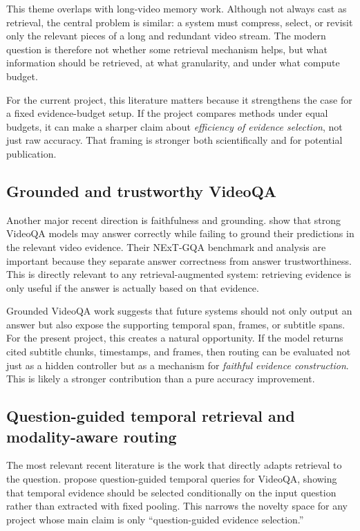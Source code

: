 \documentclass{article}
\begin{document}
This theme overlaps with long-video memory work.
Although not always cast as retrieval, the central problem is similar: a system must compress, select, or revisit only the relevant pieces of a long and redundant video stream.
The modern question is therefore not whether some retrieval mechanism helps, but what information should be retrieved, at what granularity, and under what compute budget.

For the current project, this literature matters because it strengthens the case for a fixed evidence-budget setup.
If the project compares methods under equal budgets, it can make a sharper claim about \emph{efficiency of evidence selection}, not just raw accuracy.
That framing is stronger both scientifically and for potential publication.

\subsection{Grounded and trustworthy VideoQA}
Another major recent direction is faithfulness and grounding.
\citet{xiao2023trust} show that strong VideoQA models may answer correctly while failing to ground their predictions in the relevant video evidence.
Their NExT-GQA benchmark and analysis are important because they separate answer correctness from answer trustworthiness.
This is directly relevant to any retrieval-augmented system: retrieving evidence is only useful if the answer is actually based on that evidence.

Grounded VideoQA work suggests that future systems should not only output an answer but also expose the supporting temporal span, frames, or subtitle spans.
For the present project, this creates a natural opportunity.
If the model returns cited subtitle chunks, timestamps, and frames, then routing can be evaluated not just as a hidden controller but as a mechanism for \emph{faithful evidence construction}.
This is likely a stronger contribution than a pure accuracy improvement.

\subsection{Question-guided temporal retrieval and modality-aware routing}
The most relevant recent literature is the work that directly adapts retrieval to the question.
\citet{amoroso2024pqr} propose question-guided temporal queries for VideoQA, showing that temporal evidence should be selected conditionally on the input question rather than extracted with fixed pooling.
This narrows the novelty space for any project whose main claim is only ``question-guided evidence selection.''
\end{document}
